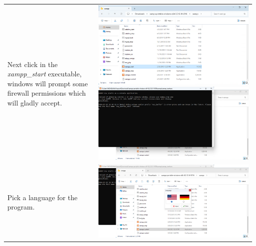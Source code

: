 \documentclass[11pt,a4paper]{report}
\begin{document}
\begin{tabular}{ l r }
            Next click in the \textit{xampp\_start} executable, windows
            will prompt some firewall permissions which will gladly accept. & \includegraphics[scale=0.3]{install_xampp10} \includegraphics[scale=0.3]{install_xampp13} \\

            Pick a language for the program.                                & \includegraphics[scale=0.3]{install_xampp14} \\


\end{tabular}
\end{document}
